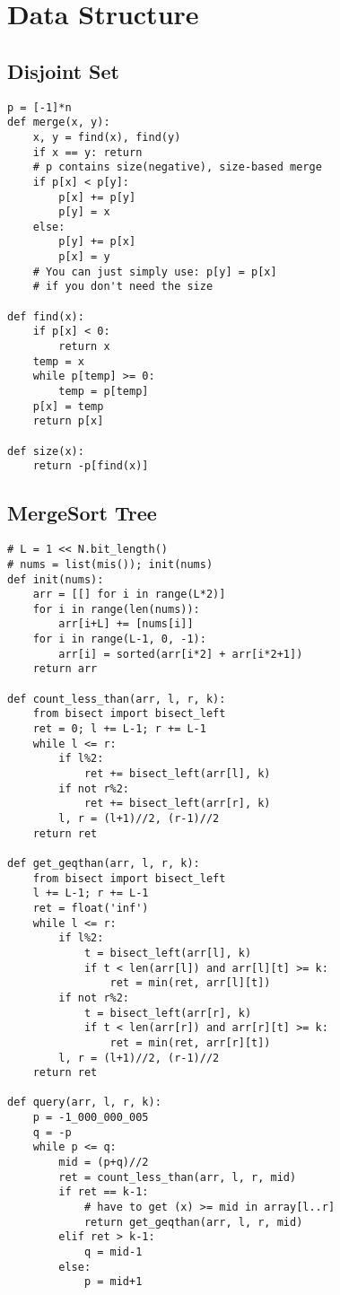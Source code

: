 \documentclass[landscape, 8pt, a4paper, oneside, twocolumn]{extarticle}
\begin{document}
\section{Data Structure}
\subsection{Disjoint Set}
\begin{verbatim}
p = [-1]*n
def merge(x, y):
    x, y = find(x), find(y)
    if x == y: return
    # p contains size(negative), size-based merge
    if p[x] < p[y]:
        p[x] += p[y]
        p[y] = x
    else:
        p[y] += p[x]
        p[x] = y
    # You can just simply use: p[y] = p[x]
    # if you don't need the size

def find(x):
    if p[x] < 0:
        return x
    temp = x
    while p[temp] >= 0:
        temp = p[temp]
    p[x] = temp
    return p[x]

def size(x):
    return -p[find(x)]
\end{verbatim}
\subsection{MergeSort Tree}
\begin{verbatim}
# L = 1 << N.bit_length()
# nums = list(mis()); init(nums)
def init(nums):
    arr = [[] for i in range(L*2)]
    for i in range(len(nums)):
        arr[i+L] += [nums[i]]
    for i in range(L-1, 0, -1):
        arr[i] = sorted(arr[i*2] + arr[i*2+1])
    return arr

def count_less_than(arr, l, r, k):
    from bisect import bisect_left
    ret = 0; l += L-1; r += L-1
    while l <= r:
        if l%2:
            ret += bisect_left(arr[l], k)
        if not r%2:
            ret += bisect_left(arr[r], k)
        l, r = (l+1)//2, (r-1)//2
    return ret

def get_geqthan(arr, l, r, k):
    from bisect import bisect_left
    l += L-1; r += L-1
    ret = float('inf')
    while l <= r:
        if l%2:
            t = bisect_left(arr[l], k)
            if t < len(arr[l]) and arr[l][t] >= k:
                ret = min(ret, arr[l][t])
        if not r%2:
            t = bisect_left(arr[r], k)
            if t < len(arr[r]) and arr[r][t] >= k:
                ret = min(ret, arr[r][t])
        l, r = (l+1)//2, (r-1)//2
    return ret

def query(arr, l, r, k):
    p = -1_000_000_005
    q = -p
    while p <= q:
        mid = (p+q)//2
        ret = count_less_than(arr, l, r, mid)
        if ret == k-1:
            # have to get (x) >= mid in array[l..r]
            return get_geqthan(arr, l, r, mid)
        elif ret > k-1:
            q = mid-1
        else:
            p = mid+1
\end{verbatim}
\end{document}

